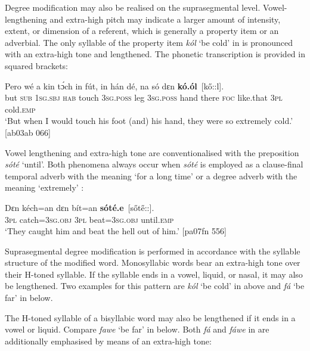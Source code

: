 Degree modification may also be realised on the suprasegmental level. Vowel-lengthening and extra-high pitch may indicate a larger amount of intensity, extent, or dimension of a referent, which is generally a property item or an adverbial. The only syllable of the property item \textit{kól} ‘be cold’ in  is pronounced with an extra-high tone and lengthened. The phonetic transcription is provided in squared brackets: 



\ea%
    \label{ex:key:893}
    \gll Pero    wé  a    kin  tɔ́ch    in    fút,
in    hán    dé,    na  só    dɛn  \textbf{kó.ól}~\textup{[k\H{o}::l]}.\\
but    \textsc{sub}  \textsc{1sg.sbj}  \textsc{hab}  touch  \textsc{3sg.poss}  leg
\textsc{3sg.poss}  hand  there  \textsc{foc}  like.that  \textsc{3pl}  cold.\textsc{emp}\\

\glt ‘But when I would touch his foot (and) his hand,
they were so extremely cold.’ [ab03ab 066]
\z

Vowel lengthening and extra-high tone are conventionalised with the preposition \textit{sóté} ‘until’. Both phenomena always occur when \textit{sóté} is employed as a clause-final temporal adverb with the meaning ‘for a long time’ or a degree adverb with the meaning ‘extremely’ :


\ea%
    \label{ex:key:894}
    \gll Dɛn  kéch=an    dɛn  bít=an    \textbf{sóté.e}~\textup{[s\H{o}t\H{e}::]}.\\
\textsc{3pl}  catch=\textsc{3sg.obj}  \textsc{3pl}  beat=\textsc{3sg.obj}  until.\textsc{emp}\\

\glt ‘They caught him and beat the hell out of him.’ [pa07fn 556]
\z

Suprasegmental degree modification is performed in accordance with the syllable structure of the modified word. Monosyllabic words bear an extra-high tone over their H-toned syllable. If the syllable ends in a vowel, liquid, or nasal, it may also be lengthened. Two examples for this pattern are \textit{kól} ‘be cold’ in  above and \textit{fá} ‘be far’ in  below.


The H-toned syllable of a bisyllabic word may also be lengthened if it ends in a vowel or liquid. Compare \textit{fawe} ‘be far’ in  below. Both \textit{fá} and \textit{fáwe} in  are additionally emphasised by means of an extra-high tone: 



